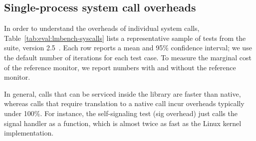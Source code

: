 \subsection{Single-process system call overheads}
\label{eval:perf:syscalls}


In order to understand the overheads of individual system calls,
Table~\ref{tab:eval:lmbench-syscalls} lists 
a representative sample of 
tests from the
\lmbench{} suite, version 2.5~\cite{McVoy:lmbench}.
Each row reports a mean and 95\% confidence interval;
we use the default number of iterations for each test case.
To measure the marginal cost of the reference monitor, we report numbers with and without 
the reference monitor.

In general, calls that can be serviced inside the library are faster than native,
whereas calls that require translation to a native call incur overheads typically under 100\%.
For instance, 
the self-signaling test (sig overhead)
just calls the signal handler as a function,
which is almost twice as fast
as the Linux kernel implementation.  

\begin{table}[t!b!]

\caption{\lmbench{} comparison among (1) native Linux processes, (2) \graphene{} \picoprocs{} on Linux host, both without and with the SECCOMP filter ({\bf +SC}) and reference monitor ({\bf +RM}), and (3) \graphene{} in SGX enclaves.
Execution time is in microseconds, and lower is better. 
Overheads are relative to Linux; negative overheads indicate improved performance.} 
\label{tab:eval:lmbench-syscalls}
\end{table}


